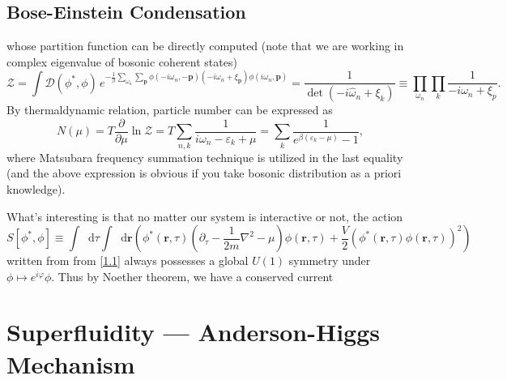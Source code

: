 \documentclass[10pt,nofootinbib]{revtex4}
\newcommand*\dd{\mathop{}\!\mathrm{d}}
\begin{document}
		\subsection{Bose-Einstein Condensation}
		whose partition function can be directly computed (note that we are working in complex eigenvalue of bosonic coherent states)
		\begin{equation*}
			\mathcal{Z}=\int\mathcal{D}(\phi^*,\phi)\,e^{-\frac{1}{\beta}\sum_{\omega_n}\sum_{\bm{p}}\phi(-i\omega_n,-\bm{p})(-i\omega_n+\xi_{\bm{p}})\phi(i\omega_n,\bm{p})}=\dfrac{1}{\det(-i\hat{\omega}_n+\xi_k)}\equiv\prod_{\omega_n}\prod_{k}\dfrac{1}{-i\omega_n+\xi_p}.
		\end{equation*}
		By thermaldynamic relation, particle number can be expressed as
		\begin{equation}\label{1.2}
			N(\mu)=T\dfrac{\partial }{\partial \mu}\ln\mathcal{Z}=T\sum_{n,k}\dfrac{1}{i\omega_n- \varepsilon_k+\mu}=\sum_k\dfrac{1}{e^{\beta(\varepsilon_k-\mu)}-1},
		\end{equation}
		where Matsubara frequency summation technique is utilized in the last equality (and the above expression is obvious if you take bosonic distribution as a priori knowledge).\par
		What's interesting is that no matter our system is interactive or not, the action
		\begin{equation}\label{1.3}
			S[\phi^*,\phi]\equiv\int\dd\tau\int\dd\bm{r}\left(\phi^*(\bm{r},\tau)(\partial_\tau-\dfrac{1}{2m}\nabla^2-\mu)\phi(\bm{r},\tau)+\dfrac{V}{2}(\phi^*(\bm{r},\tau)\phi(\bm{r},\tau))^2\right)
		\end{equation}
		written from from \eqref{1.1} always possesses a global $U(1)$ symmetry under $\phi\mapsto e^{i\varphi}\phi$. Thus by Noether theorem, we have a conserved current


\section{Superfluidity --- Anderson-Higgs Mechanism}



\end{document}
